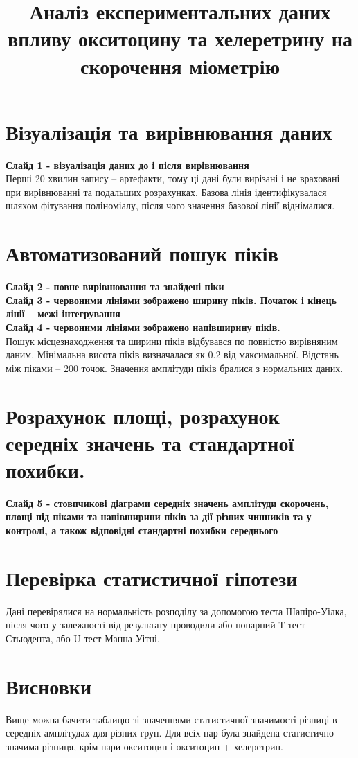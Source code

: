 \documentclass[12pt, a4paper]{article}
\title{Аналіз експериментальних даних впливу окситоцину та хелеретрину на
        скорочення міометрію}
\date{}
\begin{document}
\maketitle

\thispagestyle{empty}
\section{Візуалізація та вирівнювання даних}
\textbf{Слайд 1 - візуалізація даних до і після вирівнювання}
\\
Перші 20 хвилин запису -- артефакти, тому ці дані були вирізані і не враховані
при вирівнюванні та подальших розрахунках. Базова лінія ідентифікувалася шляхом
фітування поліноміалу, після чого значення базової лінії віднімалися.

\section{Автоматизований пошук піків}
\textbf{Слайд 2 - повне вирівнювання та знайдені піки}
\\
\textbf{Слайд 3 - червоними лініями зображено ширину піків. Початок і кінець
лінії --  межі інтегрування}
\\
\textbf{Слайд 4 - червоними лініями зображено напівширину піків.}
\\
Пошук місцезнаходження та ширини піків відбувався по повністю вирівняним даним. Мінімальна
висота піків визначалася як 0.2 від максимальної. Відстань між піками -- 200
точок. Значення амплітуди піків бралися з нормальних даних. 

\section{Розрахунок площі, розрахунок середніх значень та стандартної похибки.}
\textbf{Слайд 5 - стовпчикові діаграми середніх значень амплітуди скорочень,
площі під піками та напівширини піків за дії різних чинників та у контролі, а
також відповідні стандартні похибки середнього} 

\section{Перевірка статистичної гіпотези}
Дані перевірялися на нормальність розподілу за допомогою теста Шапіро-Уілка,
після чого у залежності від результату проводили або попарний Т-тест Стьюдента,
або U-тест Манна-Уітні.

\newpage
\thispagestyle{empty}
\section{Висновки\\}
\begin{center}
\end{center}
\par
Вище можна бачити таблицю зі значеннями статистичної значимості різниці в середніх амплітудах
для різних груп. Для всіх пар була знайдена статистично значима різниця, крім пари окситоцин і
окситоцин + хелеретрин.
\end{document}
